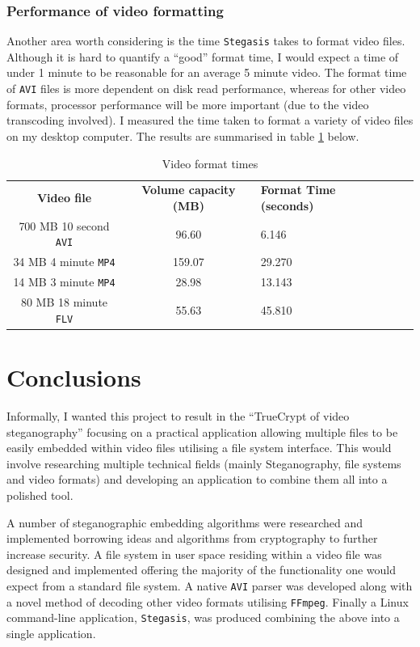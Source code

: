 \documentclass[paper=a4, fontsize=11pt,twoside]{scrartcl}    %
\numberwithin{table}{section}
\numberwithin{figure}{section}
\numberwithin{algorithm}{section}
\begin{document}
\subsubsection{Performance of video formatting}

Another area worth considering is the time \texttt{Stegasis} takes to format video files. Although it is hard to quantify a ``good'' format time, I would expect a time of under 1 minute to be reasonable for an average 5 minute video. The format time of \texttt{AVI} files is more dependent on disk read performance, whereas for other video formats, processor performance will be more important (due to the video transcoding involved). I measured the time taken to format a variety of video files on my desktop computer. The results are summarised in table \ref{formatres} below.

\begin{table}[h]
\centering
\begin{tabular}{|c|c|lll}
\cline{1-2}
\textbf{Video file} & \textbf{Volume capacity (MB)} & \textbf{Format Time (seconds)}      \\ \cline{1-2}
700 MB 10 second \texttt{AVI} & 96.60 & 6.146   \\ \cline{1-2}
34 MB 4 minute \texttt{MP4} & 159.07 & 29.270   \\ \cline{1-2}
14 MB 3 minute \texttt{MP4} & 28.98 & 13.143   \\ \cline{1-2}
80 MB 18 minute \texttt{FLV} & 55.63 & 45.810  \\ \cline{1-2}
\end{tabular}
\caption{Video format times}
\label{formatres}
\end{table}

\section{Conclusions}

Informally, I wanted this project to result in the ``TrueCrypt of video steganography'' focusing on a practical application allowing multiple files to be easily embedded within video files utilising a file system interface. This would involve researching multiple technical fields (mainly Steganography, file systems and video formats) and developing an application to combine them all into a polished tool.

A number of steganographic embedding algorithms were researched and implemented borrowing ideas and algorithms from cryptography to further increase security. A file system in user space residing within a video file was designed and implemented offering the majority of the functionality one would expect from a standard file system. A native \texttt{AVI} parser was developed along with a novel method of decoding other video formats utilising \texttt{FFmpeg}. Finally a Linux command-line application, \texttt{Stegasis}, was produced combining the above into a single application.
\end{document}
